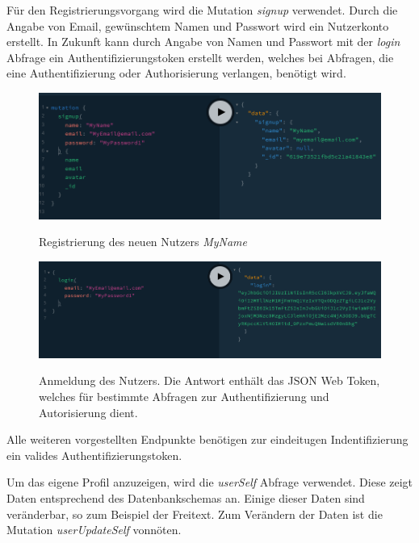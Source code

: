 Für den Registrierungsvorgang wird die Mutation \textit{signup} verwendet. Durch die Angabe von Email, gewünschtem Namen und Passwort wird ein Nutzerkonto erstellt. In Zukunft kann durch Angabe von Namen und Passwort mit der \textit{login} Abfrage ein Authentifizierungstoken erstellt werden, welches bei Abfragen, die eine Authentifizierung oder Authorisierung verlangen, benötigt wird.

\begin{figure}
	\centering
    \includegraphics[width=\textwidth]{sources/graphiql_signup.png}\cite{}
	\caption{Registrierung des neuen Nutzers \textit{MyName}}
	\label{figGQL2}
\end{figure}

\begin{figure}
	\centering
    \includegraphics[width=\textwidth]{sources/graphiql_login.png}\cite{}
	\caption{Anmeldung des Nutzers. Die Antwort enthält das JSON Web Token, welches für bestimmte Abfragen zur Authentifizierung und Autorisierung dient.}
	\label{figGQL3}
\end{figure}

Alle weiteren vorgestellten Endpunkte benötigen zur eindeitugen Indentifizierung ein valides Authentifizierungstoken.

Um das eigene Profil anzuzeigen, wird die \textit{userSelf} Abfrage verwendet. Diese zeigt Daten entsprechend des Datenbankschemas an. Einige dieser Daten sind veränderbar, so zum Beispiel der Freitext. Zum Verändern der Daten ist die Mutation \textit{userUpdateSelf} vonnöten.

